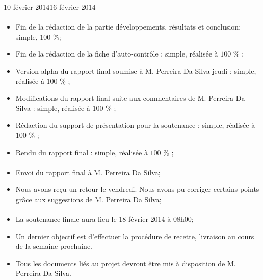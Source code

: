 \documentclass[11pt, french]{report-rd-info}
\begin{document}
\begin{fichesuivi}{10 février 2014}{16 février 2014}
\paragraph{}
	\begin{travaileffectue}
		\begin{itemize}
			\item  Fin de la rédaction de la partie développements, résultats et conclusion: simple, $100$ \%;
			\item Fin de la rédaction de la fiche d’auto-contrôle  : simple, réalisée à $100$ \% ;
			\item Version alpha du rapport final soumise à M. Perreira Da Silva jeudi :  simple, réalisée à $100$ \% ;
			\item Modifications du rapport final suite aux commentaires de   M. Perreira Da Silva : simple, réalisée à $100$ \% ;
			\item Rédaction du support de présentation pour la soutenance : simple, réalisée à $100$ \% ;
			\item Rendu du rapport final : simple, réalisée à $100$ \% ;
		\end{itemize}
	\end{travaileffectue}


\paragraph{}
	\begin{echange}
		\begin{itemize}
			\item Envoi du rapport final à M. Perreira Da Silva;
			\item Nous avons reçu un retour le vendredi. Nous avons pu corriger certains points grâce aux suggestions de M. Perreira Da Silva;
		\end{itemize}
	\end{echange}

\paragraph*{}
	\begin{planification}
		\begin{itemize}
			\item La soutenance finale aura lieu le 18 février 2014 à 08h00;
			\item Un dernier objectif est d’effectuer la procédure de recette, livraison au cours de la semaine prochaine.
			\item Tous les documents liés au projet devront être mis à disposition de M. Perreira Da Silva.
\end{itemize}
	\end{planification}
\end{fichesuivi}
\end{document}
